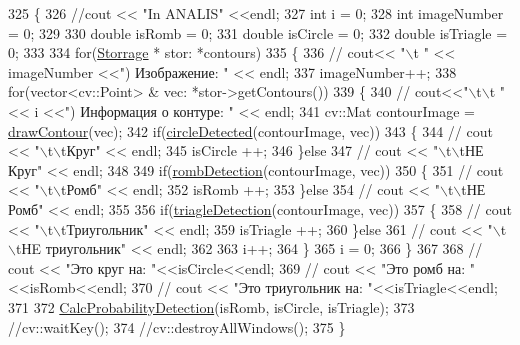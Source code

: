 \begin{DoxyCode}
325 \{
326     \textcolor{comment}{//cout << "In ANALIS" <<endl;}
327     \textcolor{keywordtype}{int} i = 0;
328     \textcolor{keywordtype}{int} imageNumber = 0;
329 
330     \textcolor{keywordtype}{double} isRomb = 0;
331     \textcolor{keywordtype}{double} isCircle = 0;
332     \textcolor{keywordtype}{double} isTriagle = 0;
333 
334     \textcolor{keywordflow}{for}(\hyperlink{class_storrage}{Storrage} * stor: *contours)
335     \{
336 \textcolor{comment}{//        cout<< "\(\backslash\)t " << imageNumber <<") Изображение: " << endl;}
337         imageNumber++;
338         \textcolor{keywordflow}{for}(vector<cv::Point> & vec: *stor->getContours())
339         \{
340 \textcolor{comment}{//            cout<<"\(\backslash\)t\(\backslash\)t "<< i <<") Информация о контуре: " << endl;}
341             cv::Mat contourImage = \hyperlink{class_contour_analis_a8dfbcc0a15123202d1af035f7206d87c}{drawContour}(vec);
342             \textcolor{keywordflow}{if}(\hyperlink{class_contour_analis_a2e67419653bf28f2bbf6766e2ffa1089}{circleDetected}(contourImage, vec))
343             \{
344 \textcolor{comment}{//                cout << "\(\backslash\)t\(\backslash\)tКруг" << endl;}
345                 isCircle ++;
346             \}\textcolor{keywordflow}{else}
347 \textcolor{comment}{//                cout << "\(\backslash\)t\(\backslash\)tНЕ Круг" << endl;}
348 
349             \textcolor{keywordflow}{if}(\hyperlink{class_contour_analis_a1970e01e1762c299753c0d57f0879915}{rombDetection}(contourImage, vec))
350             \{
351 \textcolor{comment}{//                cout << "\(\backslash\)t\(\backslash\)tРомб" << endl;}
352                 isRomb ++;
353             \}\textcolor{keywordflow}{else}
354 \textcolor{comment}{//                cout << "\(\backslash\)t\(\backslash\)tНЕ Ромб" << endl;}
355 
356             \textcolor{keywordflow}{if}(\hyperlink{class_contour_analis_a5c8b79c28a07825f5413cd98640d8dd2}{triagleDetection}(contourImage, vec))
357             \{
358 \textcolor{comment}{//                cout << "\(\backslash\)t\(\backslash\)tТриугольник" << endl;}
359                 isTriagle ++;
360             \}\textcolor{keywordflow}{else}
361 \textcolor{comment}{//                cout << "\(\backslash\)t\(\backslash\)tНE триугольник" << endl;}
362 
363             i++;
364         \}
365         i = 0;
366     \}
367 
368 \textcolor{comment}{//    cout << "Это круг на: "<<isCircle<<endl;}
369 \textcolor{comment}{//    cout << "Это ромб на: "<<isRomb<<endl;}
370 \textcolor{comment}{//    cout << "Это триугольник на: "<<isTriagle<<endl;}
371 
372     \hyperlink{class_contour_analis_a1a8b2ccb473a901f51cc21339c16c3ea}{CalcProbabilityDetection}(isRomb, isCircle, isTriagle);
373     \textcolor{comment}{//cv::waitKey();}
374     \textcolor{comment}{//cv::destroyAllWindows();}
375 \}
\end{DoxyCode}
